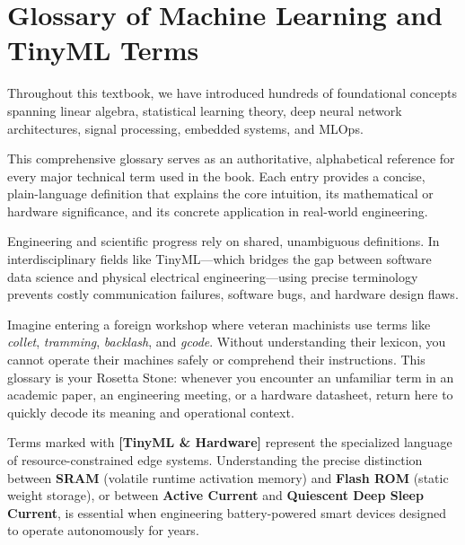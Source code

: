 \chapter{Glossary of Machine Learning and TinyML Terms}\label{app:glossary}

Throughout this textbook, we have introduced hundreds of foundational concepts spanning linear algebra, statistical learning theory, deep neural network architectures, signal processing, embedded systems, and MLOps.

This comprehensive glossary serves as an authoritative, alphabetical reference for every major technical term used in the book. Each entry provides a concise, plain-language definition that explains the core intuition, its mathematical or hardware significance, and its concrete application in real-world engineering.

\begin{keyidea}
Engineering and scientific progress rely on shared, unambiguous definitions. In interdisciplinary fields like TinyML---which bridges the gap between software data science and physical electrical engineering---using precise terminology prevents costly communication failures, software bugs, and hardware design flaws.
\end{keyidea}

\begin{analogy}
Imagine entering a foreign workshop where veteran machinists use terms like \emph{collet}, \emph{tramming}, \emph{backlash}, and \emph{gcode}. Without understanding their lexicon, you cannot operate their machines safely or comprehend their instructions. This glossary is your Rosetta Stone: whenever you encounter an unfamiliar term in an academic paper, an engineering meeting, or a hardware datasheet, return here to quickly decode its meaning and operational context.
\end{analogy}

\begin{iotbox}
Terms marked with \textnormal{\sffamily\scriptsize\bfseries [TinyML \& Hardware]} represent the specialized language of resource-constrained edge systems. Understanding the precise distinction between \textbf{SRAM} (volatile runtime activation memory) and \textbf{Flash ROM} (static weight storage), or between \textbf{Active Current} and \textbf{Quiescent Deep Sleep Current}, is essential when engineering battery-powered smart devices designed to operate autonomously for years.
\end{iotbox}

